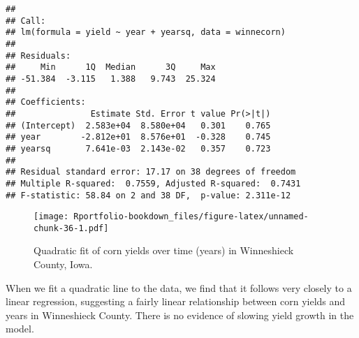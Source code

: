 \documentclass[
]{book}
\newenvironment{Shaded}{\begin{snugshade}}{\end{snugshade}}
\newcommand{\AttributeTok}[1]{\textcolor[rgb]{0.77,0.63,0.00}{#1}}
\newcommand{\CommentTok}[1]{\textcolor[rgb]{0.56,0.35,0.01}{\textit{#1}}}
\newcommand{\FunctionTok}[1]{\textcolor[rgb]{0.00,0.00,0.00}{#1}}
\newcommand{\NormalTok}[1]{#1}
\newcommand{\OtherTok}[1]{\textcolor[rgb]{0.56,0.35,0.01}{#1}}
\newcommand{\SpecialCharTok}[1]{\textcolor[rgb]{0.00,0.00,0.00}{#1}}
\newcommand{\StringTok}[1]{\textcolor[rgb]{0.31,0.60,0.02}{#1}}
\begin{document}
\begin{verbatim}
## 
## Call:
## lm(formula = yield ~ year + yearsq, data = winnecorn)
## 
## Residuals:
##     Min      1Q  Median      3Q     Max 
## -51.384  -3.115   1.388   9.743  25.324 
## 
## Coefficients:
##               Estimate Std. Error t value Pr(>|t|)
## (Intercept)  2.583e+04  8.580e+04   0.301    0.765
## year        -2.812e+01  8.576e+01  -0.328    0.745
## yearsq       7.641e-03  2.143e-02   0.357    0.723
## 
## Residual standard error: 17.17 on 38 degrees of freedom
## Multiple R-squared:  0.7559, Adjusted R-squared:  0.7431 
## F-statistic: 58.84 on 2 and 38 DF,  p-value: 2.311e-12
\end{verbatim}

\begin{Shaded}
\end{Shaded}

\begin{figure}
\centering
\texttt{[image: Rportfolio-bookdown\_files/figure-latex/unnamed-chunk-36-1.pdf]}
\caption{\label{fig:unnamed-chunk-36}Quadratic fit of corn yields over time (years) in Winneshieck County, Iowa.}
\end{figure}

When we fit a quadratic line to the data, we find that it follows very closely to a linear regression, suggesting a fairly linear relationship between corn yields and years in Winneshieck County. There is no evidence of slowing yield growth in the model.
\end{document}
